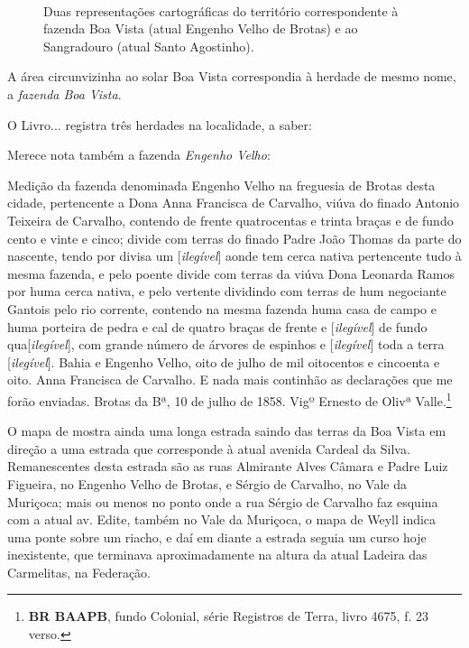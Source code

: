 \begin{figure}[!htp]
\centering
{}
\  %
\caption{Duas representações cartográficas do território correspondente à fazenda Boa Vista (atual Engenho Velho de Brotas) e ao Sangradouro (atual Santo Agostinho).}
\end{figure}

A área circunvizinha ao solar Boa Vista correspondia à herdade de mesmo nome, a \textit{fazenda Boa Vista}.

O Livro... registra três herdades na localidade, a saber:




Merece nota também a fazenda \textit{Engenho Velho}:

\begin{citacao}
Medição da fazenda denominada Engenho Velho na freguesia de Brotas desta cidade, pertencente a Dona Anna Francisca de Carvalho, viúva do finado Antonio Teixeira de Carvalho, contendo de frente quatrocentas e trinta braças e de fundo cento e vinte e cinco; divide com terras do finado Padre João Thomas da parte do nascente, tendo por divisa um [\textit{ilegível}] aonde tem cerca nativa pertencente tudo à mesma fazenda, e pelo poente divide com terras da viúva Dona Leonarda Ramos por huma cerca nativa, e pelo vertente dividindo com terras de hum negociante Gantois pelo rio corrente, contendo na mesma fazenda huma casa de campo e huma porteira de pedra e cal de quatro braças de frente e [\textit{ilegível}] de fundo qua[\textit{ilegível}], com grande número de árvores de espinhos e [\textit{ilegível}] toda a terra [\textit{ilegível}]. Bahia e Engenho Velho, oito de julho de mil oitocentos e cincoenta e oito. Anna Francisca de Carvalho. E nada mais continhão as declarações que me forão enviadas. Brotas da Bª, 10 de julho de 1858.
Vigº Ernesto de Olivª Valle.\footnote{\textbf{BR BAAPB}, fundo Colonial, série Registros de Terra, livro 4675, f. 23 verso.}
\end{citacao}

O mapa de  mostra ainda uma longa estrada saindo das terras da Boa Vista em direção a uma estrada que corresponde à atual avenida Cardeal da Silva. Remanescentes desta estrada são as ruas Almirante Alves Câmara e Padre Luiz Figueira, no Engenho Velho de Brotas, e Sérgio de Carvalho, no Vale da Muriçoca; mais ou menos no ponto onde a rua Sérgio de Carvalho faz esquina com a atual av. Edite, também no Vale da Muriçoca, o mapa de Weyll indica uma ponte sobre um riacho, e daí em diante a estrada seguia um curso hoje inexistente, que terminava aproximadamente na altura da atual Ladeira das Carmelitas, na Federação. 

